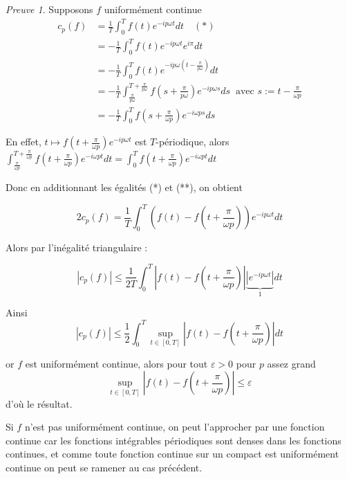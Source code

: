 \documentclass[]{article}
\theoremstyle{remark}
\newtheorem{myproof}{Preuve}
\theoremstyle{definition}
\begin{document}
\begin{myproof}
	Supposons $f$ uniformément continue
	$$\begin{aligned}
	c_p(f) &= \frac{1}{T} \int_{0}^{T} f(t) e^{-i p \omega t} dt \quad (*)\\
	&=-\frac{1}{T} \int_{0}^{T} f(t) e^{-i p \omega t} e^{i \pi} dt\\
	&=-\frac{1}{T} \int_{0}^{T} f(t)e^{\displaystyle -i p \omega \left(t - \frac{\pi}{p \omega}\right)} dt\\
	&=- \frac{1}{T} \int_{\frac{\pi}{p \omega}}^{T + \frac{\pi}{p \omega}} f\left(s + \frac{\pi}{p \omega}\right) e^{-i p \omega s} ds ~ \text{ avec } s := t - \frac{\pi}{\omega p} \\
	&=-\frac{1}{T}\int_0^T f \left(s + \frac{\pi}{\omega p}\right) e^{-i \omega p s} ds
	\end{aligned}
	$$
	
	En effet, $\displaystyle t \mapsto f\left(t + \frac{\pi}{\omega p}\right) e^{- i p \omega t}$ est $T$-périodique, alors $\displaystyle \int_{\frac{\pi}{\omega p}}^{T + \frac{\pi}{\omega p}} f \left(t + \frac{\pi}{\omega p}\right) e^{-i \omega p t} dt = \int_0^T f \left(t + \frac{\pi}{\omega p}\right) e^{-i \omega p t} dt$
	
	Donc en additionnant les égalités (*) et (**), on obtient
	
	$$2 c_p(f) = \frac{1}{T} \int_0^T \left(f(t) - f\left(t + \frac{\pi}{\omega p}\right)\right) e^{- i p \omega t} dt$$
	
	Alors par l'inégalité triangulaire :
	
	$$|c_p(f)| \leqslant \frac{1}{2T} \int_0^T \left|f(t) - f\left(t+\frac{\pi}{\omega p}\right)\right|\underbrace{|e^{-i p \omega t}|}_{1}dt$$
	
	Ainsi $$|c_p(f)| \leqslant \frac{1}{2} \int_0^T \sup\limits_{t \in [0, T]} \left|f(t) - f\left(t+\frac{\pi}{\omega p}\right)\right|dt$$
	
	or $f$ est uniformément continue, alors pour tout $\varepsilon > 0 $ pour $p$ assez grand $$\sup\limits_{t \in [0, T]} \left|f(t) - f\left(t+\frac{\pi}{\omega p}\right)\right| \leqslant \varepsilon$$ d'où le résultat.
	
	Si $f$ n'est pas uniformément continue, on peut l'approcher par une fonction continue car les fonctions intégrables périodiques sont denses dans les fonctions continues, et comme toute fonction continue sur un compact est uniformément continue on peut se ramener au cas précédent.
\end{myproof}
\end{document}
